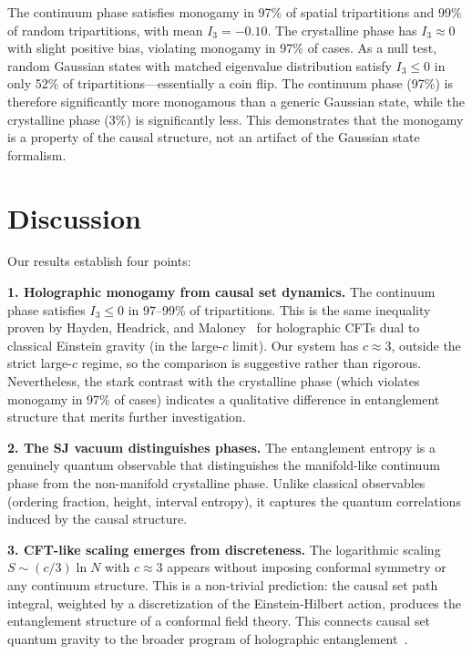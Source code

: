 \documentclass[aps,prd,twocolumn,superscriptaddress,nofootinbib]{revtex4-2}
\begin{document}
The continuum phase satisfies monogamy in 97\% of spatial tripartitions and 99\% of random tripartitions, with mean $I_3 = -0.10$. The crystalline phase has $I_3 \approx 0$ with slight positive bias, violating monogamy in 97\% of cases. As a null test, random Gaussian states with matched eigenvalue distribution satisfy $I_3 \leq 0$ in only 52\% of tripartitions---essentially a coin flip. The continuum phase (97\%) is therefore significantly more monogamous than a generic Gaussian state, while the crystalline phase (3\%) is significantly less. This demonstrates that the monogamy is a property of the causal structure, not an artifact of the Gaussian state formalism.

\section{Discussion}

Our results establish four points:

\textbf{1. Holographic monogamy from causal set dynamics.} The continuum phase satisfies $I_3 \leq 0$ in 97--99\% of tripartitions. This is the same inequality proven by Hayden, Headrick, and Maloney~\cite{hayden2013} for holographic CFTs dual to classical Einstein gravity (in the large-$c$ limit). Our system has $c \approx 3$, outside the strict large-$c$ regime, so the comparison is suggestive rather than rigorous. Nevertheless, the stark contrast with the crystalline phase (which violates monogamy in 97\% of cases) indicates a qualitative difference in entanglement structure that merits further investigation.

\textbf{2. The SJ vacuum distinguishes phases.} The entanglement entropy is a genuinely quantum observable that distinguishes the manifold-like continuum phase from the non-manifold crystalline phase. Unlike classical observables (ordering fraction, height, interval entropy), it captures the quantum correlations induced by the causal structure.

\textbf{3. CFT-like scaling emerges from discreteness.} The logarithmic scaling $S \sim (c/3)\ln N$ with $c \approx 3$ appears without imposing conformal symmetry or any continuum structure. This is a non-trivial prediction: the causal set path integral, weighted by a discretization of the Einstein-Hilbert action, produces the entanglement structure of a conformal field theory. This connects causal set quantum gravity to the broader program of holographic entanglement~\cite{ryu2006,calabrese2004}.
\end{document}
